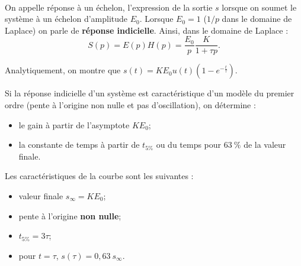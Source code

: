 \documentclass[10pt,fleqn]{article} %
\begin{document}
\begin{resultat}~\\
On appelle réponse à un échelon, l'expression de la sortie $s$ lorsque on soumet le système à un échelon d'amplitude $E_0$. Lorsque $E_0=1$ ($1/p$ dans le domaine de Laplace) on parle de \textbf{réponse indicielle}.
Ainsi, dans le domaine de Laplace :
$$
S(p)=E(p)H(p) = \dfrac{E_0}{p} \dfrac{K}{1+\tau p}.
$$ 

Analytiquement, on montre que $s(t)=K E_0 u(t) \left(1-e^{-\frac{t}{\tau}}\right)$. 


\noindent \begin{minipage}[c]{.65\linewidth}

Si la réponse indicielle d'un système est caractéristique d'un modèle du premier ordre (pente à l'origine non nulle et pas d'oscillation), on détermine :
\begin{itemize}
\item le gain à partir de l'asymptote $K E_0$;
\item la constante de temps à partir de $t_{5\%}$ ou du temps pour $63~\%$ de la valeur finale.%
\end{itemize}
Les caractéristiques de la courbe sont les suivantes : 
\begin{itemize}
\item valeur finale $s_{\infty}=K E_0$;
\item pente à l'origine \textbf{non nulle};
\item $t_{5\%}=3\tau$;
\item pour $t=\tau$, $s(\tau)=0,63~ s_{\infty}$.
\end{itemize}
\end{minipage} \hfill
\begin{minipage}[c]{.32\linewidth}
\centering

\end{minipage}
\end{resultat}
\end{document}

